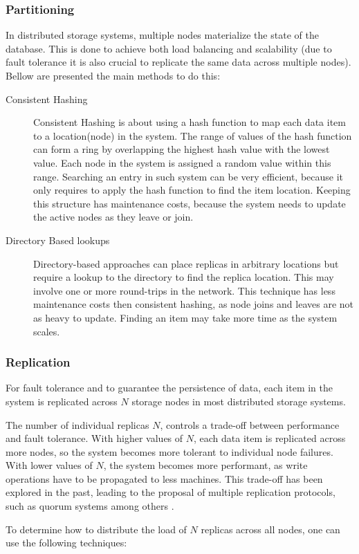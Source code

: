 \subsubsection{Partitioning}
\label{sec:partitioning}
In distributed storage systems, multiple nodes materialize the state of the database. This is done to achieve both load balancing and scalability (due to fault tolerance it is also crucial to replicate the same data across multiple nodes). Bellow are presented the main methods to do this:

\begin{description}
\item[Consistent Hashing] Consistent Hashing\cite{consistent_hashing} is about using a hash function to map each data item to a location(node) in the system. The range of values of the hash function can form a ring by overlapping the highest hash value with the lowest value. Each node in the system is assigned a random value within this range. Searching an entry in such system can be very efficient, because it only requires to apply the hash function to find the item location. Keeping this structure has maintenance costs, because the system needs to update the active nodes as they leave or join.

\item[Directory Based lookups]\cite{data_replication_p2p} Directory-based approaches can place replicas in arbitrary locations but require a lookup to the directory to find the replica location. This may involve one or more round-trips in the network. This technique has less maintenance costs then consistent hashing, as node joins and leaves are not as heavy to update. Finding an item may take more time as the system scales.

\end{description}

\subsubsection{Replication}
\label{sec:replication}
For fault tolerance and to guarantee the persistence of data\cite{data_replication_p2p}, each item in the system is replicated across $N$ storage nodes in most distributed storage systems.\par
	The number of individual replicas $N$, controls a trade-off between performance and fault tolerance. With higher values of $N$, each data item is replicated across more nodes, so the system becomes more tolerant to individual node failures. With lower values of $N$, the system becomes more performant, as write operations have to be propagated to less machines. This trade-off has been explored in the past\cite{cap}, leading to the proposal of multiple replication protocols, such as quorum systems\cite{quorum_commit} among others \cite{state_machine_replication, atomic_broadcast}.\par
	To determine how to distribute the load of $N$ replicas across all nodes, one can use the following techniques:
	
